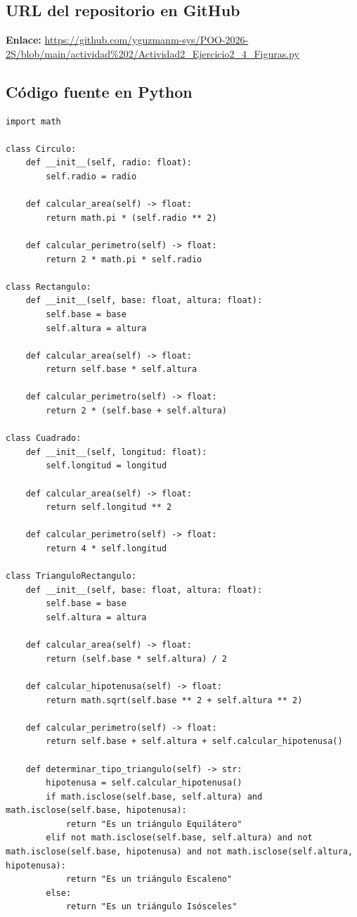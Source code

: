 \documentclass[11pt,a4paper]{article}
\begin{document}
\subsection{URL del repositorio en GitHub}
\noindent \textbf{Enlace:} \url{https://github.com/yguzmanm-sys/POO-2026-2S/blob/main/actividad%202/Actividad2_Ejercicio2_4_Figuras.py}

\subsection{Código fuente en Python}
\begin{lstlisting}[caption={Implementación de Figuras Geométricas (\texttt{Actividad2\_Ejercicio2\_4\_Figuras.py})}]
import math

class Circulo:
    def __init__(self, radio: float):
        self.radio = radio

    def calcular_area(self) -> float:
        return math.pi * (self.radio ** 2)

    def calcular_perimetro(self) -> float:
        return 2 * math.pi * self.radio

class Rectangulo:
    def __init__(self, base: float, altura: float):
        self.base = base
        self.altura = altura

    def calcular_area(self) -> float:
        return self.base * self.altura

    def calcular_perimetro(self) -> float:
        return 2 * (self.base + self.altura)

class Cuadrado:
    def __init__(self, longitud: float):
        self.longitud = longitud

    def calcular_area(self) -> float:
        return self.longitud ** 2

    def calcular_perimetro(self) -> float:
        return 4 * self.longitud

class TrianguloRectangulo:
    def __init__(self, base: float, altura: float):
        self.base = base
        self.altura = altura

    def calcular_area(self) -> float:
        return (self.base * self.altura) / 2

    def calcular_hipotenusa(self) -> float:
        return math.sqrt(self.base ** 2 + self.altura ** 2)

    def calcular_perimetro(self) -> float:
        return self.base + self.altura + self.calcular_hipotenusa()

    def determinar_tipo_triangulo(self) -> str:
        hipotenusa = self.calcular_hipotenusa()
        if math.isclose(self.base, self.altura) and math.isclose(self.base, hipotenusa):
            return "Es un triángulo Equilátero"
        elif not math.isclose(self.base, self.altura) and not math.isclose(self.base, hipotenusa) and not math.isclose(self.altura, hipotenusa):
            return "Es un triángulo Escaleno"
        else:
            return "Es un triángulo Isósceles"


\end{lstlisting}
\end{document}
